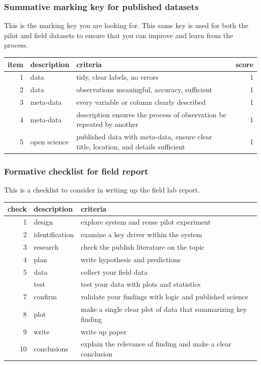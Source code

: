 \documentclass[
]{book}
\begin{document}
\hypertarget{summative-marking-key-for-published-datasets}{%
\subsubsection*{Summative marking key for published datasets}\label{summative-marking-key-for-published-datasets}}

This is the marking key you are looking for. This same key is used for both the pilot and field datasets to ensure that you can improve and learn from the process.

\begin{tabular}{rllr}
\toprule
item & description & criteria & score\\
\midrule
1 & data & tidy, clear labels, no errors & 1\\
2 & data & observations meaningful, accuracy, sufficient & 1\\
3 & meta-data & every variable or column clearly described & 1\\
4 & meta-data & description ensures the process of observation be repeated by another & 1\\
5 & open science & published data with meta-data, ensure clear title, location, and details sufficient & 1\\
\bottomrule
\end{tabular}

\hypertarget{formative-checklist-for-field-report}{%
\subsubsection*{Formative checklist for field report}\label{formative-checklist-for-field-report}}

This is a checklist to consider in writing up the field lab report.

\begin{tabular}{rll}
\toprule
check & description & criteria\\
\midrule
1 & design & explore system and reuse pilot experiment\\
2 & identification & examine a key driver within the system\\
3 & research & check the publish literature on the topic\\
4 & plan & write hypothesis and predictions\\
5 & data & collect your field data\\
\addlinespace
6 & test & test your data with plots and statistics\\
7 & confirm & validate your findings with logic and published science\\
8 & plot & make a single clear plot of data that summarizing key finding\\
9 & write & write up paper\\
10 & conclusions & explain the relevance of finding and make a clear conclusion\\
\bottomrule
\end{tabular}
\end{document}
